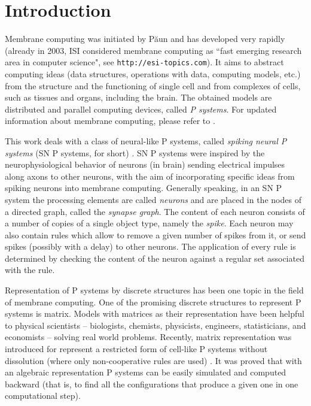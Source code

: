 \documentclass[runningheads]{llncs}
\begin{document}
\section{Introduction}

Membrane computing was initiated by P\u{a}un \cite{cell1} and has
developed very rapidly (already in 2003, ISI considered membrane
computing as ``fast emerging research area in computer science", see
{\tt http://esi-topics.com}).  It aims to abstract computing ideas
(data structures, operations with data, computing models, etc.) from
the structure and the functioning of single cell and from complexes
of cells, such as tissues and organs, including the brain. The
obtained models are distributed and parallel computing devices,
called \emph{P systems}. For updated information about membrane
computing, please refer to \cite{hMC}.

This work deals with a class of neural-like P systems, called
\emph{spiking neural P systems} (SN P systems, for short)
\cite{Ionescu1}. SN P systems were inspired by the
neurophysiological behavior of neurons (in brain) sending electrical
impulses along axons to other neurons, with the aim of incorporating
specific ideas from spiking neurons into membrane computing.
Generally speaking, in an SN P system the processing elements are
called \emph{neurons} and are placed in the nodes of a directed
graph, called the \emph{synapse graph}. The content of each neuron
consists of a number of copies of a single object type, namely the
\emph{spike}. Each neuron may also contain rules which allow to
remove a given number of spikes from it, or send spikes (possibly
with a delay) to other neurons. The application of every rule is
determined by checking the content of the neuron against a regular
set associated with the rule.

Representation of P systems by discrete structures has been one
topic in the field of membrane computing. One of the promising
discrete structures to represent P systems is matrix. Models with
matrices as their representation have been helpful to physical
scientists -- biologists, chemists, physicists, engineers,
statisticians, and economists -- solving real world problems.
Recently, matrix representation was introduced for represent a
restricted form of cell-like P systems without dissolution (where
only non-cooperative rules are used) \cite{Miguel}. It was proved
that with an algebraic representation P systems can be easily
simulated and computed backward (that is, to find all the
configurations that produce a given one in one computational step).
\end{document}
